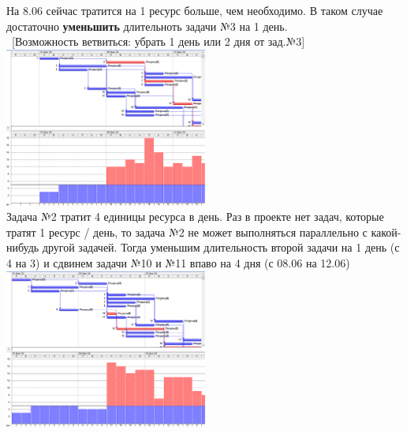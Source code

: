 \documentclass[14pt]{article}
\begin{document}
	На 8.06 сейчас тратится на 1 ресурс больше, чем необходимо.
	В таком случае достаточно \textbf{уменьшить} длительноть задачи №3 на 1 день.\\ \
	[Возможность ветвиться: убрать 1 день или 2 дня от зад.№3]\\
	\includegraphics[width=0.5\textwidth]{../img/ot1a1_4.png}\\
	Задача №2 тратит 4 единицы ресурса в день.
	Раз в проекте нет задач, которые тратят 1 ресурс / день, то задача №2
		не может выполняться параллельно с какой-нибудь другой задачей.
	Тогда уменьшим длительность второй задачи на 1 день (с 4 на 3) и сдвинем задачи №10 и №11 впаво на 4 дня (с 08.06 на 12.06)\\
	\includegraphics[width=0.5\textwidth]{../img/ot1a1_5.png}\\
\end{document}
